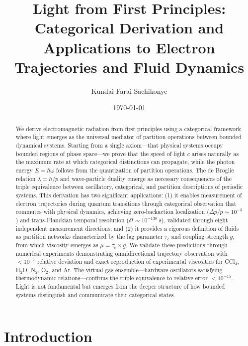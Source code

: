 \documentclass[aps,prl,twocolumn,superscriptaddress,floatfix]{revtex4-2}
\begin{document}
\title{Light from First Principles: Categorical Derivation and Applications to Electron Trajectories and Fluid Dynamics}

\author{Kundai Farai Sachikonye}

\date{\today}

\begin{abstract}
We derive electromagnetic radiation from first principles using a categorical framework where light emerges as the universal mediator of partition operations between bounded dynamical systems. Starting from a single axiom---that physical systems occupy bounded regions of phase space---we prove that the speed of light $c$ arises naturally as the maximum rate at which categorical distinctions can propagate, while the photon energy $E = \hbar\omega$ follows from the quantization of partition operations. The de Broglie relation $\lambda = h/p$ and wave-particle duality emerge as necessary consequences of the triple equivalence between oscillatory, categorical, and partition descriptions of periodic systems. This derivation has two significant applications: (1) it enables measurement of electron trajectories during quantum transitions through categorical observation that commutes with physical dynamics, achieving zero-backaction localization ($\Delta p/p \sim 10^{-3}$) and trans-Planckian temporal resolution ($\delta t \sim 10^{-138}$ s), validated through eight independent measurement directions; and (2) it provides a rigorous definition of fluids as partition networks characterized by the lag parameter $\tau_c$ and coupling strength $g$, from which viscosity emerges as $\mu = \tau_c \times g$. We validate these predictions through numerical experiments demonstrating omnidirectional trajectory observation with $<10^{-7}$ relative deviation and exact reproduction of experimental viscosities for CCl$_4$, H$_2$O, N$_2$, O$_2$, and Ar. The virtual gas ensemble---hardware oscillators satisfying thermodynamic relations---confirms the triple equivalence to relative error $<10^{-15}$. Light is not fundamental but emerges from the deeper structure of how bounded systems distinguish and communicate their categorical states.
\end{abstract}

\maketitle

\section{Introduction}
\end{document}
